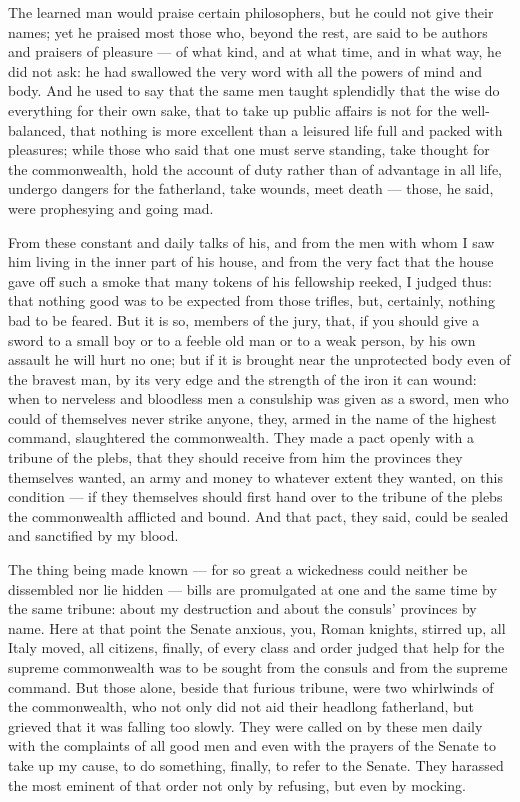  The learned man would praise certain philosophers, but he could not give their names; yet he praised most those who, beyond the rest, are said to be authors and praisers of pleasure --- of what kind, and at what time, and in what way, he did not ask: he had swallowed the very word with all the powers of mind and body. And he used to say that the same men taught splendidly that the wise do everything for their own sake, that to take up public affairs is not for the well-balanced, that nothing is more excellent than a leisured life full and packed with pleasures; while those who said that one must serve standing, take thought for the commonwealth, hold the account of duty rather than of advantage in all life, undergo dangers for the fatherland, take wounds, meet death --- those, he said, were prophesying and going mad.

 From these constant and daily talks of his, and from the men with whom I saw him living in the inner part of his house, and from the very fact that the house gave off such a smoke that many tokens of his fellowship reeked, I judged thus: that nothing good was to be expected from those trifles, but, certainly, nothing bad to be feared. But it is so, members of the jury, that, if you should give a sword to a small boy or to a feeble old man or to a weak person, by his own assault he will hurt no one; but if it is brought near the unprotected body even of the bravest man, by its very edge and the strength of the iron it can wound: when to nerveless and bloodless men a consulship was given as a sword, men who could of themselves never strike anyone, they, armed in the name of the highest command, slaughtered the commonwealth. They made a pact openly with a tribune of the plebs, that they should receive from him the provinces they themselves wanted, an army and money to whatever extent they wanted, on this condition --- if they themselves should first hand over to the tribune of the plebs the commonwealth afflicted and bound. And that pact, they said, could be sealed and sanctified by my blood.

 The thing being made known --- for so great a wickedness could neither be dissembled nor lie hidden --- bills are promulgated at one and the same time by the same tribune: about my destruction and about the consuls' provinces by name. Here at that point the Senate anxious, you, Roman knights, stirred up, all Italy moved, all citizens, finally, of every class and order judged that help for the supreme commonwealth was to be sought from the consuls and from the supreme command. But those alone, beside that furious tribune, were two whirlwinds of the commonwealth, who not only did not aid their headlong fatherland, but grieved that it was falling too slowly. They were called on by these men daily with the complaints of all good men and even with the prayers of the Senate to take up my cause, to do something, finally, to refer to the Senate. They harassed the most eminent of that order not only by refusing, but even by mocking.

